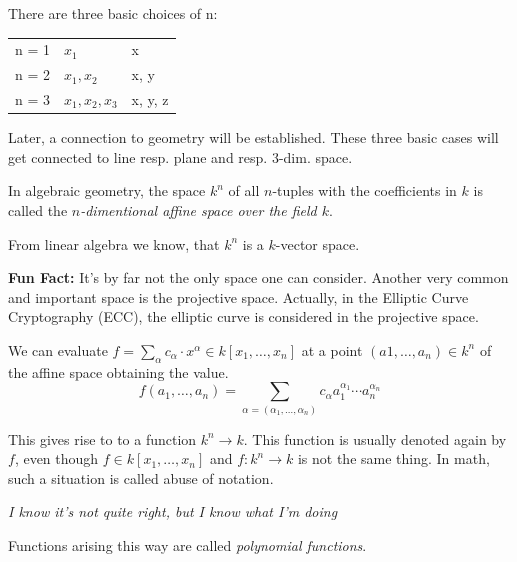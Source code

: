 \begin{remark}[title = Remark 1.1.4]
    There are three basic choices of n:  
    \begin{center}
    \begin{tabular}{l|l|l}
      n = 1 & $x_1$ & x \\
      n = 2 & $x_1, x_2$ & x, y \\
      n = 3 & $x_1, x_2, x_3$ & x, y, z
    \end{tabular} 
  \end{center} 

    Later, a connection to geometry will be established. These three basic cases will get connected to line resp. plane and resp. 3-dim. space.
\end{remark}

\begin{definition}[title = Definition 1.1.5]
    In algebraic geometry, the space $k^n$ of all $n$-tuples with the coefficients in $k$ is called the \textit{$n$-dimentional affine space over the field $k$}.  
    
    From linear algebra we know, that $k^n$ is a $k$-vector space.  
\end{definition} 

\textbf{Fun Fact:} It's by far not the only space one can consider. Another very common and important space is the projective space. Actually, in the Elliptic Curve Cryptography (ECC), 
the elliptic curve is considered in the projective space.

\begin{definition}[title = Definition 1.1.6]
    We can evaluate $f = \sum_\alpha c_\alpha \cdot x^\alpha \in k[x_1, \dots, x_n]$ at a point $(a1, \dots, a_n) \in k^n$ of the affine space obtaining the value. 
    \[f(a_1, \dots, a_n) = \sum_{\alpha = (\alpha_1, \dots, \alpha_n)} c_\alpha a_1^{\alpha_1} \cdots a_n^{\alpha_n}\]    
  
    This gives rise to to a function $k^n \to k$. This function is usually denoted again by $f$, even though $f \in k[x_1, \dots, x_n]$ and $f: k^n \to k$ is not the 
    same thing. In math, such a situation is called abuse of notation. 
    
    \hspace*{0.5cm}\textcolor{airforceblue}{\textit{I know it's not quite right, but I know what I'm doing}}
    
    Functions arising this way are called \textit{polynomial functions}.
\end{definition} 

